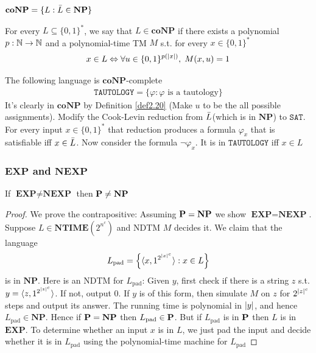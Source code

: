 \documentclass[11pt]{article}
\def \EXP {\textbf{EXP}}
\def \NTIME {\textbf{NTIME}}
\def \NP {\textbf{NP}}
\def \coNP {\textbf{coNP}}
\def \NEXP {\textbf{NEXP}}
\def \pad {\text{pad}}
\def \NP {\textbf{NP}}
\def \SAT {\texttt{SAT}}
\def \TAUTOLOGY {\texttt{TAUTOLOGY}}
\begin{document}
\begin{definition}[]
\label{def2.19}
\(\coNP=\{L:\barL\in\NP\}\)
\end{definition}

\begin{definition}
\label{def2.20}
For every \(L\subseteq\{0,1\}^*\), we say that \(L\in\coNP\) if there exists a
polynomial \(p:\mathbb{N}\to\mathbb{N}\) and a polynomial-time TM \(M\) s.t. for every \(x\in\{0,1\}^*\)
     \begin{equation*}
x\in L \Leftrightarrow\forall u\in\{0,1\}^{p(\abs{x})},\; M(x,u)=1
     \end{equation*}
\end{definition}

\begin{examplle}[]
The following language is \(\coNP\)-complete
     \begin{align*}
\TAUTOLOGY=\{\varphi:\varphi\text{ is a tautology}\}
     \end{align*}
It's clearly in \(\coNP\) by Definition \ref{def2.20} (Make \(u\) to be the all possible
assignments). Modify the Cook-Levin reduction 
from \(\bar{L}\)(which is in \(\NP\)) to \(\SAT\). For every input \(x\in\{0,1\}^*\) that
reduction produces a formula \(\varphi_x\) that is satisfiable iff \(x\in\bar{L}\). Now consider
the formula \(\neg\varphi_x\). It is in \(\TAUTOLOGY\) iff \(x\in L\)
\end{examplle}

\subsubsection{\(\EXP\) and \(\NEXP\)}
\label{sec:orgc3dead4}
\begin{theorem}[]
If \(\EXP\neq\NEXP\) then \(\bP\neq\NP\)
\end{theorem}

\begin{proof}
We prove the contrapositive: Assuming \(\bP=\NP\) we show \(\EXP=\NEXP\).
Suppose \(L\in\NTIME(2^{n^c})\) and NDTM \(M\) decides it. We claim that the language
     \begin{equation*}
L_{\pad}=\left\{\la x,1^{2^{\abs{x}^c}}\ra:x\in L
\right\}
     \end{equation*}
is in \(\NP\). Here is an NDTM for \(L_{\pad}\): Given \(y\), first check if there is a
string \(z\) s.t. \(y=\la z,1^{2^{\abs{z}^c}}\ra\). If not, output 0. If \(y\) is of this form,
then simulate \(M\) on \(z\) for \(2^{\abs{z}^c}\) steps and output its answer. The running
time is polynomial in \(\abs{y}\), and hence \(L_{\pad}\in\NP\). Hence if \(\bP=\NP\)
then \(L_{\pad}\in\bP\). But if \(L_{\pad}\) is in \(\operatorname{\textbf{P}}\) then \(L\) is in \(\EXP\). To
determine whether an input \(x\) is in \(L\), we just pad the input and decide whether it is
in \(L_{\pad}\) using the polynomial-time machine for \(L_{\pad}\)
\end{proof}
\end{document}
